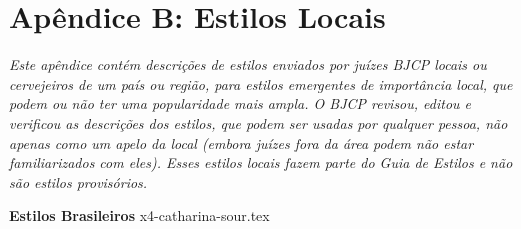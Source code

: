 \clearpage
{}
\divisorLine
\section*{Apêndice B: Estilos Locais}

\textit{Este apêndice contém descrições de estilos enviados por juízes BJCP locais ou cervejeiros de um país ou região, para estilos emergentes de importância local, que podem ou não ter uma popularidade mais ampla. O BJCP revisou, editou e verificou as descrições dos estilos, que podem ser usadas por qualquer pessoa, não apenas como um apelo da local (embora juízes fora da área podem não estar familiarizados com eles). Esses estilos locais fazem parte do Guia de Estilos e não são estilos provisórios.}

\begin{multicols}{2}

  \textbf{\Large\color{blue}
  Estilos Brasileiros
  }
  {x4-catharina-sour.tex}

\end{multicols}

